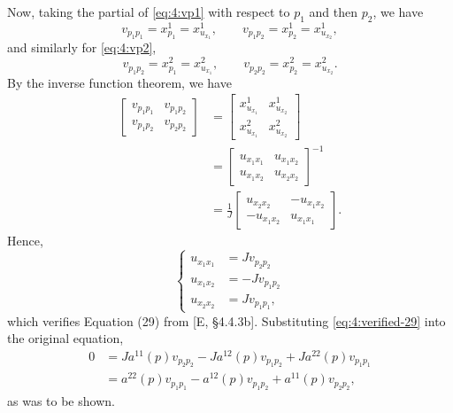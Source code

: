 \begin{solution*}
  Now, taking the partial of \eqref{eq:4:vp1} with respect to \(p_1\) and
  then \(p_2\), we have
  \[
    v_{p_1p_1}=x^1_{p_1}=x^1_{u_{x_1}}, \qquad
    v_{p_1p_2}=x^1_{p_2}=x^1_{u_{x_2}},
  \]
  and similarly for \eqref{eq:4:vp2},
  \[
    v_{p_1p_2}=x^2_{p_1}=x^2_{u_{x_1}},\qquad
    v_{p_2p_2}=x^2_{p_2}=x^2_{u_{x_2}}.
  \]
  By the inverse function theorem, we have
  \begin{align*}
    \begin{bmatrix}
      v_{p_1p_1}&v_{p_1p_2}\\
      v_{p_1p_2}&v_{p_2p_2}
    \end{bmatrix}
    &=
      \begin{bmatrix}
        x^1_{u_{x_1}}&x^1_{u_{x_2}}\\
        x^2_{u_{x_1}}&x^2_{u_{x_2}}
      \end{bmatrix}
    \\
    &=\begin{bmatrix}
      u_{x_1x_1}&u_{x_1x_2}\\
      u_{x_1x_2}&u_{x_2x_2}
    \end{bmatrix}^{-1}\\
    &=\frac{1}{J}
      \begin{bmatrix}
      u_{x_2x_2}&-u_{x_1x_2}\\
      -u_{x_1x_2}&u_{x_1x_1}
    \end{bmatrix}.
  \end{align*}
  Hence,
  \begin{equation}
    \label{eq:4:verified-29}
    \left\{
      \begin{aligned}
        u_{x_1x_1}&=Jv_{p_2p_2}\\
        u_{x_1x_2}&=-Jv_{p_1p_2}\\
        u_{x_2x_2}&=Jv_{p_1p_1},
      \end{aligned}
    \right.
  \end{equation}
  which verifies Equation (29) from [E, \S 4.4.3b]. Substituting
  \eqref{eq:4:verified-29} into the original equation,
  \begin{align*}
    0&=Ja^{11}(p)v_{p_2p_2}-Ja^{12}(p)v_{p_1p_2}+Ja^{22}(p)v_{p_1p_1}\\
     &=a^{22}(p)v_{p_1p_1}-a^{12}(p)v_{p_1p_2}+a^{11}(p)v_{p_2p_2},
  \end{align*}
  as was to be shown.
\end{solution*}

